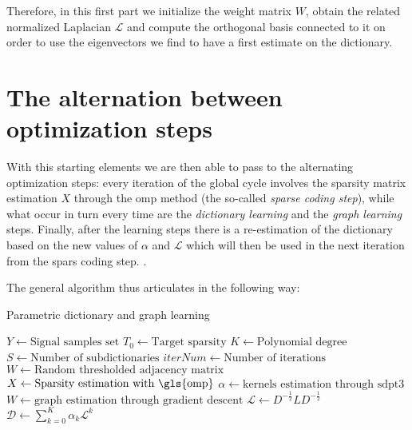 Therefore, in this first part we initialize the weight matrix $W$, obtain the related normalized Laplacian $\mathcal{L}$ and compute the orthogonal basis connected to it on order to use the eigenvectors we find to have a first estimate on the dictionary.

\section{The alternation between optimization steps}
With this starting elements we are then able to pass to the alternating optimization steps: every iteration of the global cycle involves the sparsity matrix estimation $X$ through the \gls{omp} method (the so-called \textit{sparse coding step}), while what occur in turn every time are the \textit{dictionary learning} and the \textit{graph learning} steps. Finally, after the learning steps there is a re-estimation of the dictionary based on the new values of $\alpha$ and $\mathcal{L}$ which will then be used in the next iteration from the spars coding step. .

The general algorithm thus articulates in the following way:

\begin{algorithm}[H]
  \caption{Parametric dictionary and graph learning}
  \begin{algorithmic}[1]
      \State $Y \gets \text{Signal samples set}$
      \State $T_0\gets \text{Target sparsity}$
      \State $K \gets \text{Polynomial degree}$
      \State $S \gets \text{Number of subdictionaries}$
      \State $iterNum \gets \text{Number of iterations}$
      \State $W \gets \text{Random thresholded adjacency matrix}$
    \EndProcedure
        \State $X \gets \text{Sparsity estimation with \gls{omp}}$
      \EndProcedure
         \label{5}
          \State $\alpha \gets \text{kernels estimation through sdpt3}$
        \Else
          \State $W \gets \text{graph estimation through gradient descent}$
          \State $\mathcal{L} \gets D^{-\frac{1}{2}}LD^{-\frac{1}{2}}$
        \EndIf
      \EndProcedure
        \State $\mathcal{D} \gets \sum_{k=0}^K \alpha_k \mathcal{L}^k$
      \EndProcedure
    \EndFor
    \end{algorithmic}
\end{algorithm}

